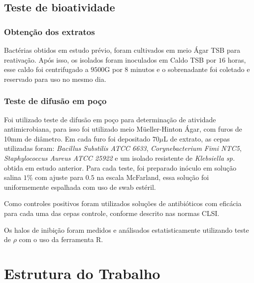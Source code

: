 \subsection{Teste de bioatividade}
\subsubsection{Obtenção dos extratos}
Bactérias obtidos em estudo prévio, foram cultivados em meio Ágar TSB para
reativação. Após isso, os isolados foram inoculados em Caldo TSB por $16$ horas,
esse caldo foi centrifugado a $9500$G por $8$ minutos e o sobrenadante foi coletado
e reservado para uso no mesmo dia.
\subsubsection{Teste de difusão em poço}
Foi utilizado teste de difusão em poço para determinação de atividade antimicrobiana,
para isso foi utilizado meio Müeller-Hinton Ágar, com furos de 10mm de diâmetro.
Em cada furo foi depositado $70\mu$L de extrato, as cepas utilizadas foram:
\textit{Bacillus Substilis ATCC 6633}, \textit{Corynebacterium Fimi NTC5}, \textit{Staphylococcus Aureus ATCC 25922}
e um isolado resistente de \textit{Klebsiella sp.} obtida em estudo anterior.
Para cada teste, foi preparado inóculo em solução salina $1$\% com ajuste para $0.5$
na escala McFarland, essa solução foi uniformemente espalhada com uso de swab estéril.

Como controles positivos foram utilizados soluções de antibióticos com
eficácia para cada uma das cepas controle, conforme descrito nas normas CLSI\cite{clsi2020}.

Os halos de inibição foram medidos e análisados estatisticamente utilizando teste de $\rho$ com
o uso da ferramenta R.



\section{Estrutura do Trabalho}




